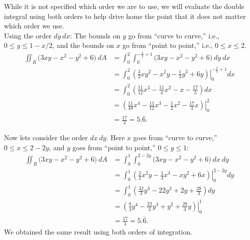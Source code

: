 {While it is not specified which order we are to use, we will evaluate the double integral using both orders to help drive home the point that it does not matter which order we use.\\

Using the order $dy\ dx$:
The bounds on $y$ go from ``curve to curve,'' i.e., $0\leq y\leq 1-x/2$, and the bounds on $x$ go from ``point to point,'' i.e., $0\leq x\leq 2$.
\begin{align*}
\iint_R (3xy-x^2-y^2+6\big)\ dA &= \int_0^2\int_0^{-\frac x2+1} (3xy-x^2-y^2+6\big)\ dy\ dx\\
		&= \int_0^2\left.\left(\frac32xy^2-x^2y-\frac13y^3+6y\right)\right|_0^{-\frac x2+1}dx\\
		&= \int_0^2 \left(\frac{11}{12}x^3-\frac{11}{4}x^2-x-\frac{17}3\right)dx \\
		&= \left.\left(\frac{11}{48}x^4-\frac{11}{12}x^3-\frac12x^2-\frac{17}3x\right)\right|_0^2\\
		&= \frac{17}3=5.\overline{6}.
\end{align*}

Now lets consider the order $dx \ dy$. Here $x$ goes from ``curve to curve,'' $0\leq x\leq 2-2y$, and $y$ goes from ``point to point,'' $0\leq y\leq 1$:
\begin{align*}
\iint_R (3xy-x^2-y^2+6\big)\ dA &= \int_0^1\int_0^{2-2y} (3xy-x^2-y^2+6\big)\ dx\ dy\\
		&= \int_0^1\left.\left(\frac32x^2y-\frac13x^3-xy^2+6x\right)\right|_0^{2-2y} dy\\
		&= \int_0^1\left(\frac{32}3y^3-22y^2+2y+\frac{28}3\right)dy\\
		&=\left.\left(\frac83y^4-\frac{22}3y^3+y^2+\frac{28}3y\right)\right|_0^1\\
		&=\frac{17}3=5.\overline{6}.
\end{align*}
We obtained the same result using both orders of integration. 
}\\

